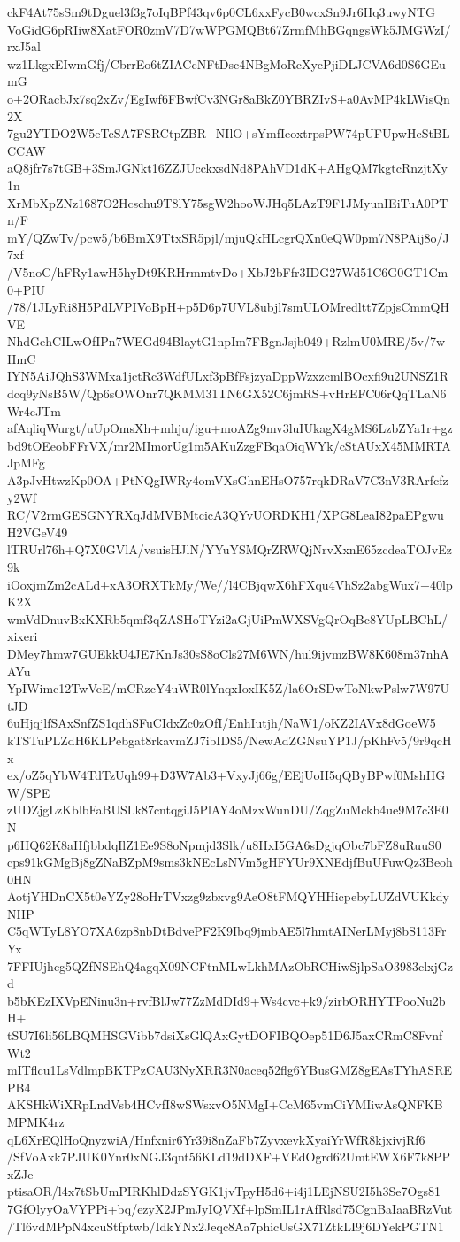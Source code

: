 ckF4At75sSm9tDguel3f3g7oIqBPf43qv6p0CL6xxFycB0wcxSn9Jr6Hq3uwyNTG
VoGidG6pRIiw8XatFOR0zmV7D7wWPGMQBt67ZrmfMhBGqngsWk5JMGWzI/rxJ5al
wz1LkgxEIwmGfj/CbrrEo6tZIACcNFtDsc4NBgMoRcXycPjiDLJCVA6d0S6GEumG
o+2ORacbJx7sq2xZv/EgIwf6FBwfCv3NGr8aBkZ0YBRZIvS+a0AvMP4kLWisQn2X
7gu2YTDO2W5eTcSA7FSRCtpZBR+NIlO+sYmfIeoxtrpsPW74pUFUpwHcStBLCCAW
aQ8jfr7s7tGB+3SmJGNkt16ZZJUcckxsdNd8PAhVD1dK+AHgQM7kgtcRnzjtXy1n
XrMbXpZNz1687O2Hcschu9T8lY75sgW2hooWJHq5LAzT9F1JMyunIEiTuA0PTn/F
mY/QZwTv/pcw5/b6BmX9TtxSR5pjl/mjuQkHLcgrQXn0eQW0pm7N8PAij8o/J7xf
/V5noC/hFRy1awH5hyDt9KRHrmmtvDo+XbJ2bFfr3IDG27Wd51C6G0GT1Cm0+PIU
/78/1JLyRi8H5PdLVPIVoBpH+p5D6p7UVL8ubjl7smULOMredltt7ZpjsCmmQHVE
NhdGehCILwOfIPn7WEGd94BlaytG1npIm7FBgnJsjb049+RzlmU0MRE/5v/7wHmC
IYN5AiJQhS3WMxa1jctRc3WdfULxf3pBfFsjzyaDppWzxzcmlBOcxfi9u2UNSZ1R
dcq9yNsB5W/Qp6sOWOnr7QKMM31TN6GX52C6jmRS+vHrEFC06rQqTLaN6Wr4cJTm
afAqliqWurgt/uUpOmsXh+mhju/igu+moAZg9mv3luIUkagX4gMS6LzbZYa1r+gz
bd9tOEeobFFrVX/mr2MImorUg1m5AKuZzgFBqaOiqWYk/cStAUxX45MMRTAJpMFg
A3pJvHtwzKp0OA+PtNQgIWRy4omVXsGhnEHsO757rqkDRaV7C3nV3RArfcfzy2Wf
RC/V2rmGESGNYRXqJdMVBMtcicA3QYvUORDKH1/XPG8LeaI82paEPgwuH2VGeV49
lTRUrl76h+Q7X0GVlA/vsuisHJlN/YYuYSMQrZRWQjNrvXxnE65zcdeaTOJvEz9k
iOoxjmZm2cALd+xA3ORXTkMy/We//l4CBjqwX6hFXqu4VhSz2abgWux7+40lpK2X
wmVdDnuvBxKXRb5qmf3qZASHoTYzi2aGjUiPmWXSVgQrOqBc8YUpLBChL/xixeri
DMey7hmw7GUEkkU4JE7KnJs30sS8oCls27M6WN/hul9ijvmzBW8K608m37nhAAYu
YpIWimc12TwVeE/mCRzcY4uWR0lYnqxIoxIK5Z/la6OrSDwToNkwPslw7W97UtJD
6uHjqjlfSAxSnfZS1qdhSFuCIdxZc0zOfI/EnhIutjh/NaW1/oKZ2IAVx8dGoeW5
kTSTuPLZdH6KLPebgat8rkavmZJ7ibIDS5/NewAdZGNsuYP1J/pKhFv5/9r9qcHx
ex/oZ5qYbW4TdTzUqh99+D3W7Ab3+VxyJj66g/EEjUoH5qQByBPwf0MshHGW/SPE
zUDZjgLzKblbFaBUSLk87cntqgiJ5PlAY4oMzxWunDU/ZqgZuMckb4ue9M7c3E0N
p6HQ62K8aHfjbbdqIlZ1Ee9S8oNpmjd3Slk/u8HxI5GA6sDgjqObc7bFZ8uRuuS0
cps91kGMgBj8gZNaBZpM9sms3kNEcLsNVm5gHFYUr9XNEdjfBuUFuwQz3Beoh0HN
AotjYHDnCX5t0eYZy28oHrTVxzg9zbxvg9AeO8tFMQYHHicpebyLUZdVUKkdyNHP
C5qWTyL8YO7XA6zp8nbDtBdvePF2K9Ibq9jmbAE5l7hmtAINerLMyj8bS113FrYx
7FFIUjhcg5QZfNSEhQ4agqX09NCFtnMLwLkhMAzObRCHiwSjlpSaO3983clxjGzd
b5bKEzIXVpENinu3n+rvfBlJw77ZzMdDId9+Ws4cvc+k9/zirbORHYTPooNu2bH+
tSU7I6li56LBQMHSGVibb7dsiXsGlQAxGytDOFIBQOep51D6J5axCRmC8FvnfWt2
mITflcu1LsVdlmpBKTPzCAU3NyXRR3N0aceq52flg6YBusGMZ8gEAsTYhASREPB4
AKSHkWiXRpLndVsb4HCvfI8wSWsxvO5NMgI+CcM65vmCiYMIiwAsQNFKBMPMK4rz
qL6XrEQlHoQnyzwiA/Hnfxnir6Yr39i8nZaFb7ZyvxevkXyaiYrWfR8kjxivjRf6
/SfVoAxk7PJUK0Ynr0xNGJ3qnt56KLd19dDXF+VEdOgrd62UmtEWX6F7k8PPxZJe
ptisaOR/l4x7tSbUmPIRKhlDdzSYGK1jvTpyH5d6+i4j1LEjNSU2I5h3Se7Ogs81
7GfOlyyOaVYPPi+bq/ezyX2JPmJyIQVXf+lpSmIL1rAfRlsd75CgnBaIaaBRzVut
/Tl6vdMPpN4xcuStfptwb/IdkYNx2Jeqc8Aa7phicUsGX71ZtkLI9j6DYekPGTN1
